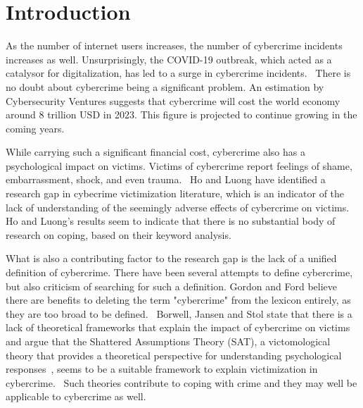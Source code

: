 \documentclass[12pt,english,titlepage,a4paper]{article}
\begin{document}

\tableofcontents
\pagebreak


\section{Introduction}

As the number of internet users increases, the number of cybercrime incidents increases as well. Unsurprisingly, the COVID-19 outbreak, which acted as a catalysor for digitalization, has led to a surge in cybercrime incidents.~\cite{Monteith2021Increasing} There is no doubt about cybercrime being a significant problem. An estimation by Cybersecurity Ventures suggests that cybercrime will cost the world economy around 8 trillion USD in 2023. This figure is projected to continue growing in the coming years.~\cite{cybersecurity-ventures-cybercrime-report}

While carrying such a significant financial cost, cybercrime also has a psychological impact on victims. Victims of cybercrime report feelings of shame, embarrassment, shock, and even trauma.~\cite{jansen2018coping} Ho and Luong have identified a research gap in cybecrime victimization literature, which is an indicator of the lack of understanding of the seemingly adverse effects of cybercrime on victims. Ho and Luong's results seem to indicate that there is no substantial body of research on coping, based on their keyword analysis.~\cite{horesearch}

What is also a contributing factor to the research gap is the lack of a unified definition of cybercrime. There have been several attempts to define cybercrime, but also criticism of searching for such a definition. Gordon and Ford believe there are benefits to deleting the term "cybercrime" from the lexicon entirely, as they are too broad to be defined.~\cite{gordon2006definition} Borwell, Jansen and Stol state that there is a lack of theoretical frameworks that explain the impact of cybercrime on victims and argue that the Shattered Assumptions Theory (SAT), a victomological theory that provides a theoretical perspective for understanding psychological responses~\cite{janoff1983theoretical}, seems to be a suitable framework to explain victimization in cybercrime.~\cite{borwell2022psychological} Such theories contribute to coping with crime and they may well be applicable to cybercrime as well.
\end{document}
